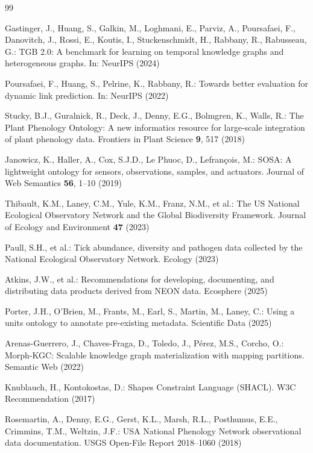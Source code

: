 
\begin{thebibliography}{99}
\small

Gastinger, J., Huang, S., Galkin, M., Loghmani, E., Parviz, A., Poursafaei, F.,
Danovitch, J., Rossi, E., Koutis, I., Stuckenschmidt, H., Rabbany, R.,
Rabusseau, G.: TGB 2.0: A benchmark for learning on temporal knowledge graphs
and heterogeneous graphs. In: NeurIPS (2024)

Poursafaei, F., Huang, S., Pelrine, K., Rabbany, R.: Towards better evaluation
for dynamic link prediction. In: NeurIPS (2022)

Stucky, B.J., Guralnick, R., Deck, J., Denny, E.G., Bolmgren, K., Walls, R.:
The Plant Phenology Ontology: A new informatics resource for large-scale
integration of plant phenology data. Frontiers in Plant Science \textbf{9},
517 (2018)

Janowicz, K., Haller, A., Cox, S.J.D., Le Phuoc, D., Lefran\c{c}ois, M.: SOSA:
A lightweight ontology for sensors, observations, samples, and actuators.
Journal of Web Semantics \textbf{56}, 1--10 (2019)

Thibault, K.M., Laney, C.M., Yule, K.M., Franz, N.M., et al.: The US National
Ecological Observatory Network and the Global Biodiversity Framework. Journal
of Ecology and Environment \textbf{47} (2023)

Paull, S.H., et al.: Tick abundance, diversity and pathogen data collected by
the National Ecological Observatory Network. Ecology (2023)

Atkins, J.W., et al.: Recommendations for developing, documenting, and
distributing data products derived from NEON data. Ecosphere (2025)

Porter, J.H., O'Brien, M., Frants, M., Earl, S., Martin, M., Laney, C.: Using
a units ontology to annotate pre-existing metadata. Scientific Data (2025)

Arenas-Guerrero, J., Chaves-Fraga, D., Toledo, J., P\'erez, M.S.,
Corcho, O.: Morph-KGC: Scalable knowledge graph materialization with mapping
partitions. Semantic Web (2022)

Knublauch, H., Kontokostas, D.: Shapes Constraint Language (SHACL). W3C
Recommendation (2017)

Rosemartin, A., Denny, E.G., Gerst, K.L., Marsh, R.L., Posthumus, E.E.,
Crimmins, T.M., Weltzin, J.F.: USA National Phenology Network observational
data documentation. USGS Open-File Report 2018--1060 (2018)


\end{thebibliography}
